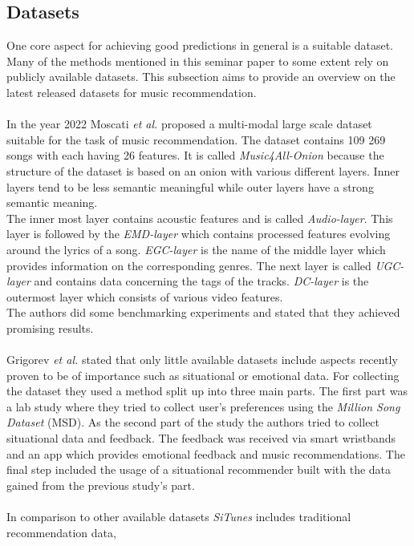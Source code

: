 \documentclass[runningheads,a4paper]{llncs}
\begin{document}
\subsection{Datasets}
One core aspect for achieving good predictions in general is a suitable dataset. Many of the methods mentioned in this seminar paper to some extent rely on publicly available datasets.
This subsection aims to provide an overview on the latest released datasets for music recommendation. \\
\\
In the year 2022 Moscati \textit{et al.} proposed a multi-modal large scale dataset suitable for the task of music recommendation. 
The dataset contains 109 269 songs with each having 26 features. It is called \textit{Music4All-Onion} because the structure of the dataset is based on an onion with various different layers.
Inner layers tend to be less semantic meaningful while outer layers have a strong semantic meaning. \\
The inner most layer contains acoustic features and is called \textit{Audio-layer}.
This layer is followed by the \textit{EMD-layer} which contains processed features evolving around the lyrics of a song.
\textit{EGC-layer} is the name of the middle layer which provides information on the corresponding genres.
The next layer is called \textit{UGC-layer} and contains data concerning the tags of the tracks. 
\textit{DC-layer} is the outermost layer which consists of various video features.\\
The authors did some benchmarking experiments and stated that they achieved promising results.\cite{moscati2022music4all}\\
\\
Grigorev \textit{et al.} stated that only little available datasets include aspects recently proven to be of importance such as situational or emotional data.
For collecting the dataset they used a method split up into three main parts.
The first part was a lab study where they tried to collect user's preferences using the \textit{Million Song Dataset} (MSD).
As the second part of the study the authors tried to collect situational data and feedback.
The feedback was received via smart wristbands and an app which provides emotional feedback and music recommendations.
The final step included the usage of a situational recommender built with the data gained from the previous study's part. \\
\\
In comparison to other available datasets \textit{SiTunes} includes traditional recommendation data, 
\end{document}
